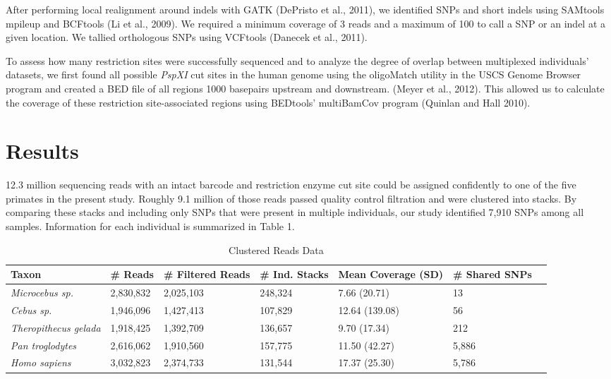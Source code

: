 \documentclass[12pt]{article}
\begin{document}
After performing local realignment around indels with GATK (DePristo et al., 2011), we identified SNPs and short indels using SAMtools mpileup and BCFtools (Li et al., 2009). We required a minimum coverage of 3 reads and a maximum of 100 to call a SNP or an indel at a given location. We tallied orthologous SNPs using VCFtools (Danecek et al., 2011).
	
To assess how many restriction sites were successfully sequenced and to analyze the degree of overlap between multiplexed individuals' datasets, we first found all possible \emph{PspXI} cut sites in the human genome using the oligoMatch utility in the USCS Genome Browser program and created a BED file of all regions 1000 basepairs upstream and downstream. (Meyer et al., 2012). This allowed us to calculate the coverage of these restriction site-associated regions using BEDtools' multiBamCov program (Quinlan and Hall 2010).

\section{Results}

12.3 million sequencing reads with an intact barcode and restriction enzyme cut site could be assigned confidently to one of the five primates in the present study. Roughly 9.1 million of those reads passed quality control filtration and were clustered into stacks. By comparing these stacks and including only SNPs that were present in multiple individuals, our study identified 7,910 SNPs among all samples. Information for each individual is summarized in Table 1. 

\begin{table}[h]
\caption{Clustered Reads Data}
\begin{center}
	\small
	\begin{tabular}{ p{3cm} || l || p{1.75cm} | p{1.75cm} || p{1.75cm} | p{1.75cm} | l }
		\hline
		Taxon                       & \# Reads  & \# Filtered Reads & \# Ind. Stacks & Mean Coverage (SD)  & \# Shared SNPs \\ \hline\hline
		\emph{Microcebus sp.}       & 2,830,832 & 2,025,103       & 248,324         &  7.66 (20.71)  & 13    \\ \hline
		\emph{Cebus sp.}            & 1,946,096 & 1,427,413       & 107,829         & 12.64 (139.08) & 56    \\ \hline
		\emph{Theropithecus gelada} & 1,918,425 & 1,392,709       & 136,657         &  9.70 (17.34)  & 212   \\ \hline
		\emph{Pan troglodytes}      & 2,616,062 & 1,910,560       & 157,775         & 11.50 (42.27)  & 5,886 \\ \hline
		\emph{Homo sapiens}         & 3,032,823 & 2,374,733       & 131,544         & 17.37 (25.30)  & 5,786 \\ \hline
	\end{tabular}
\end{center}
\end{table}
\end{document}

